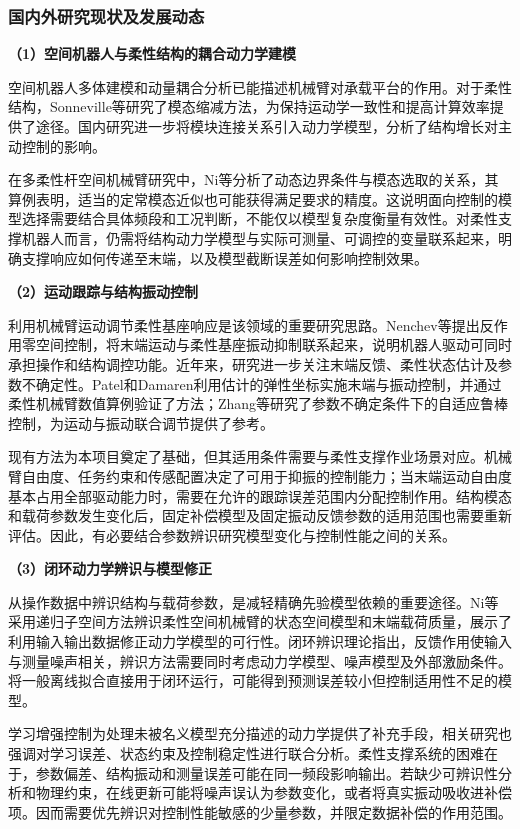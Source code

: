 \documentclass[UTF8,a4paper,zihao=-4,fontset=fandol]{ctexart}
\newcommand{\topic}[1]{\par\addvspace{0.5em}\noindent\textbf{#1}\par\nobreak}
\begin{document}
\subsubsection{国内外研究现状及发展动态}

\topic{（1）空间机器人与柔性结构的耦合动力学建模}

空间机器人多体建模和动量耦合分析已能描述机械臂对承载平台的作用\cite{papadopoulos2021}。对于柔性结构，Sonneville等研究了模态缩减方法，为保持运动学一致性和提高计算效率提供了途径\cite{sonneville2021}。国内研究进一步将模块连接关系引入动力学模型，分析了结构增长对主动控制的影响\cite{wang2020}。

在多柔性杆空间机械臂研究中，Ni等分析了动态边界条件与模态选取的关系，其算例表明，适当的定常模态近似也可能获得满足要求的精度\cite{ni2024}。这说明面向控制的模型选择需要结合具体频段和工况判断，不能仅以模型复杂度衡量有效性。对柔性支撑机器人而言，仍需将结构动力学模型与实际可测量、可调控的变量联系起来，明确支撑响应如何传递至末端，以及模型截断误差如何影响控制效果。

\topic{（2）运动跟踪与结构振动控制}

利用机械臂运动调节柔性基座响应是该领域的重要研究思路。Nenchev等提出反作用零空间控制，将末端运动与柔性基座振动抑制联系起来，说明机器人驱动可同时承担操作和结构调控功能\cite{nenchev1999}。近年来，研究进一步关注末端反馈、柔性状态估计及参数不确定性。Patel和Damaren利用估计的弹性坐标实施末端与振动控制，并通过柔性机械臂数值算例验证了方法\cite{patel2024}；Zhang等研究了参数不确定条件下的自适应鲁棒控制，为运动与振动联合调节提供了参考\cite{zhang2025}。

现有方法为本项目奠定了基础，但其适用条件需要与柔性支撑作业场景对应。机械臂自由度、任务约束和传感配置决定了可用于抑振的控制能力；当末端运动自由度基本占用全部驱动能力时，需要在允许的跟踪误差范围内分配控制作用。结构模态和载荷参数发生变化后，固定补偿模型及固定振动反馈参数的适用范围也需要重新评估。因此，有必要结合参数辨识研究模型变化与控制性能之间的关系。

\topic{（3）闭环动力学辨识与模型修正}

从操作数据中辨识结构与载荷参数，是减轻精确先验模型依赖的重要途径。Ni等采用递归子空间方法辨识柔性空间机械臂的状态空间模型和末端载荷质量，展示了利用输入输出数据修正动力学模型的可行性\cite{ni2019}。闭环辨识理论指出，反馈作用使输入与测量噪声相关，辨识方法需要同时考虑动力学模型、噪声模型及外部激励条件\cite{forssell1999}。将一般离线拟合直接用于闭环运行，可能得到预测误差较小但控制适用性不足的模型。

学习增强控制为处理未被名义模型充分描述的动力学提供了补充手段，相关研究也强调对学习误差、状态约束及控制稳定性进行联合分析\cite{brunke2022}。柔性支撑系统的困难在于，参数偏差、结构振动和测量误差可能在同一频段影响输出。若缺少可辨识性分析和物理约束，在线更新可能将噪声误认为参数变化，或者将真实振动吸收进补偿项。因而需要优先辨识对控制性能敏感的少量参数，并限定数据补偿的作用范围。
\end{document}
